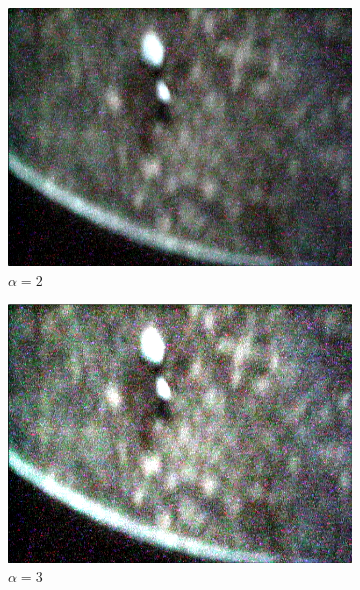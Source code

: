 \begin{figure}
        \centering
        \begin{subfigure}[b]{0.4\textwidth}
                \includegraphics[scale = 0.2]{img/contrast2times}
                \caption{$\alpha = 2$}
        \end{subfigure}
		\quad
        \begin{subfigure}[b]{0.4\textwidth}
                \includegraphics[scale = 0.2]{img/contrast3times}
                \caption{$\alpha = 3$}
        \end{subfigure} \hfill \\ \mbox{}\\
        \begin{subfigure}[b]{0.4\textwidth}

\end{subfigure}
\end{figure}
